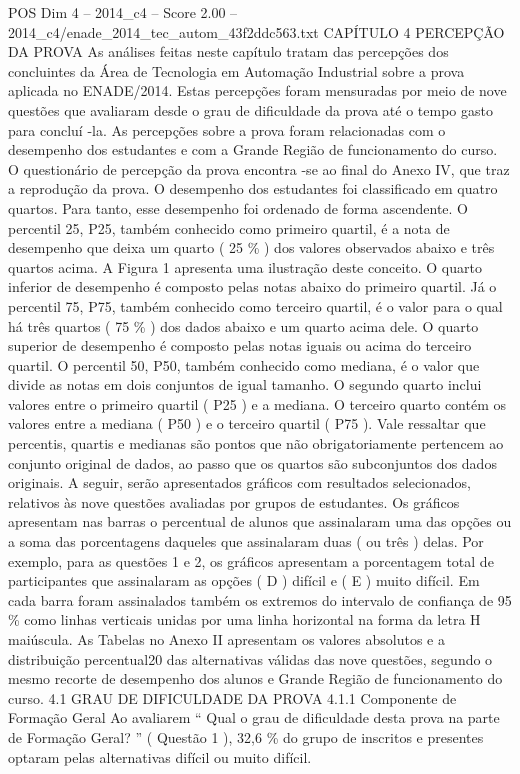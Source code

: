\begin{textsample}{POS Dim 4 – 2014\_c4 – Score 2.00 – 2014\_c4/enade\_2014\_tec\_autom\_43f2ddc563.txt}  \label{ex:f4_pos_201}
CAPÍTULO 4 PERCEPÇÃO DA PROVA As análises feitas neste capítulo tratam das percepções dos concluintes da Área de Tecnologia em Automação Industrial sobre a prova aplicada no ENADE/2014.
Estas percepções foram mensuradas por meio de nove questões que avaliaram desde o grau de dificuldade da prova até o tempo gasto para concluí -la.
As percepções sobre a prova foram relacionadas com o desempenho dos estudantes e com a Grande Região de funcionamento do curso.
O questionário de percepção da prova encontra -se ao final do Anexo IV, que traz a reprodução da prova.
O desempenho dos estudantes foi classificado em quatro quartos.
Para tanto, esse desempenho foi ordenado de forma ascendente.
O percentil 25, P25, também conhecido como primeiro quartil, é a nota de desempenho que deixa um quarto ( 25 \% ) dos valores observados abaixo e três quartos acima.
A Figura 1 apresenta uma ilustração deste conceito.
O quarto inferior de desempenho é composto pelas notas abaixo do primeiro quartil.
Já o percentil 75, P75, também conhecido como terceiro quartil, é o valor para o qual há três quartos ( 75 \% ) dos dados abaixo e um quarto acima dele.
O quarto superior de desempenho é composto pelas notas iguais ou acima do terceiro quartil.
O percentil 50, P50, também conhecido como mediana, é o valor que divide as notas em dois conjuntos de igual tamanho.
O segundo quarto inclui valores entre o primeiro quartil ( P25 ) e a mediana.
O terceiro quarto contém os valores entre a mediana ( P50 ) e o terceiro quartil ( P75 ).
Vale ressaltar que percentis, quartis e medianas são pontos que não obrigatoriamente pertencem ao conjunto original de dados, ao passo que os quartos são subconjuntos dos dados originais.
A seguir, serão apresentados gráficos com resultados selecionados, relativos às nove questões avaliadas por grupos de estudantes.
Os gráficos apresentam nas barras o percentual de alunos que assinalaram uma das opções ou a soma das porcentagens daqueles que assinalaram duas ( ou três ) delas.
Por exemplo, para as questões 1 e 2, os gráficos apresentam a porcentagem total de participantes que assinalaram as opções ( D ) difícil e ( E ) muito difícil.
Em cada barra foram assinalados também os extremos do intervalo de confiança de 95 \% como linhas verticais unidas por uma linha horizontal na forma da letra H maiúscula.
As Tabelas no Anexo II apresentam os valores absolutos e a distribuição percentual20 das alternativas válidas das nove questões, segundo o mesmo recorte de desempenho dos alunos e Grande Região de funcionamento do curso. 4.1 GRAU DE DIFICULDADE DA PROVA 4.1.1 Componente de Formação Geral Ao avaliarem “ Qual o grau de dificuldade desta prova na parte de Formação Geral? ” ( Questão 1 ), 32,6 \% do grupo de inscritos e presentes optaram pelas alternativas difícil ou muito difícil.

\end{textsample}
